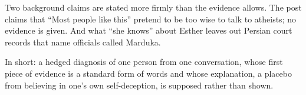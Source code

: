 \begin{afterword}
Two background claims are stated more firmly than the evidence allows. The post claims that ``Most people like this'' pretend to be too wise to talk to atheists; no evidence is given. And what ``she knows'' about Esther leaves out Persian court records that name officials called Marduka.

In short: a hedged diagnosis of one person from one conversation, whose first piece of evidence is a standard form of words and whose explanation, a placebo from believing in one's own self-deception, is supposed rather than shown.
\end{afterword}

